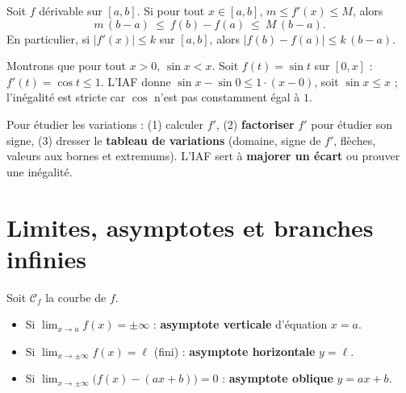 \begin{illus}
\end{illus}

\begin{propriete}
Soit $f$ dérivable sur $[a,b]$. Si pour tout $x\in[a,b]$, $m\le f'(x)\le M$, alors
\[
m\,(b-a)\ \le\ f(b)-f(a)\ \le\ M\,(b-a).
\]
En particulier, si $|f'(x)|\le k$ sur $[a,b]$, alors $|f(b)-f(a)|\le k\,(b-a)$.
\end{propriete}

\begin{exemple}
Montrons que pour tout $x>0$, $\sin x<x$. Soit $f(t)=\sin t$ sur $[0,x]$ : $f'(t)=\cos t\le1$.
L'IAF donne $\sin x-\sin0\le 1\cdot(x-0)$, soit $\sin x\le x$ ; l'inégalité est stricte
car $\cos$ n'est pas constamment égal à $1$.
\end{exemple}

\begin{aretenir}
Pour étudier les variations : (1) calculer $f'$, (2) \textbf{factoriser} $f'$ pour étudier son signe,
(3) dresser le \textbf{tableau de variations} (domaine, signe de $f'$, flèches, valeurs aux bornes
et extremums). L'IAF sert à \textbf{majorer un écart} ou prouver une inégalité.
\end{aretenir}

\section{Limites, asymptotes et branches infinies}

\begin{propriete}[Asymptotes]
Soit $\mathcal C_f$ la courbe de $f$.
\begin{itemize}
\item Si $\displaystyle\lim_{x\to a}f(x)=\pm\infty$ : \textbf{asymptote verticale} d'équation $x=a$.
\item Si $\displaystyle\lim_{x\to\pm\infty}f(x)=\ell$ (fini) : \textbf{asymptote horizontale} $y=\ell$.
\item Si $\displaystyle\lim_{x\to\pm\infty}\big(f(x)-(ax+b)\big)=0$ : \textbf{asymptote oblique} $y=ax+b$.
\end{itemize}
\end{propriete}

